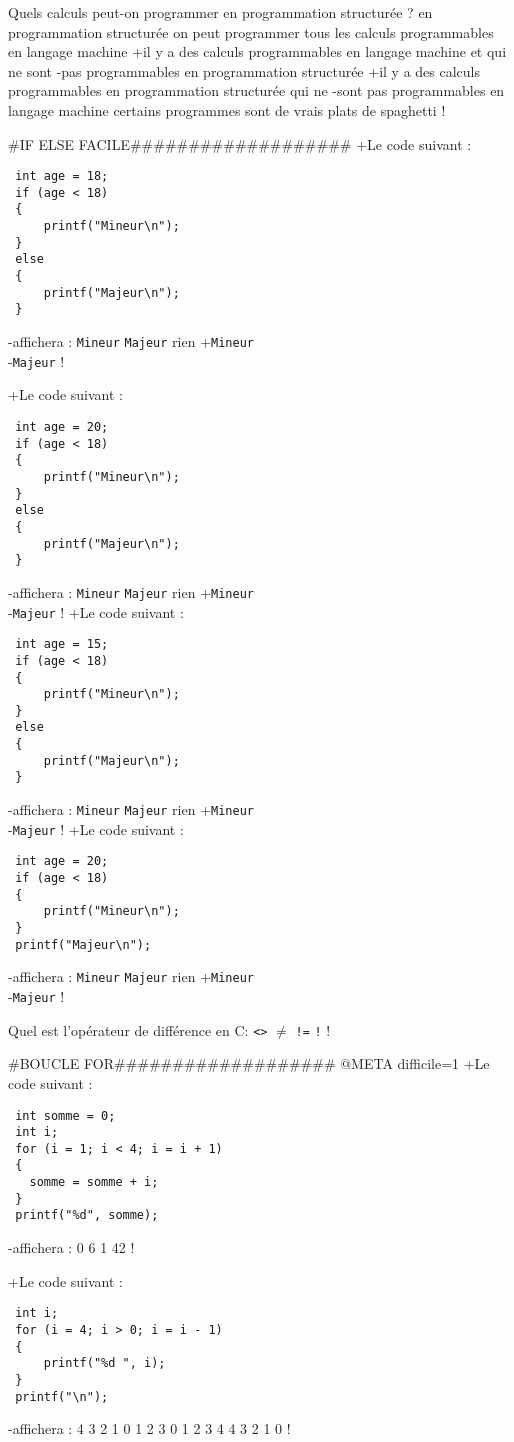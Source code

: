 Quels calculs peut-on programmer en programmation structurée ?
 en programmation structurée on peut programmer tous les calculs programmables en langage machine
+il y a des calculs programmables en langage machine et qui ne sont
-pas programmables en programmation structurée
+il y a des calculs programmables en programmation structurée qui ne
-sont pas programmables en langage machine
 certains programmes sont de vrais plats de spaghetti
!

#IF ELSE FACILE###################
+Le code suivant :
 \begin{verbatim}
 int age = 18;
 if (age < 18)
 {
     printf("Mineur\n"); 
 }
 else
 {
     printf("Majeur\n"); 
 }
 \end{verbatim}
-affichera :
 \verb|Mineur|
 \verb|Majeur|
 rien
+\verb|Mineur|\\
-\verb|Majeur|
!

+Le code suivant :
 \begin{verbatim}
 int age = 20;
 if (age < 18)
 {
     printf("Mineur\n"); 
 }
 else
 {
     printf("Majeur\n"); 
 }
 \end{verbatim}
-affichera :
 \verb|Mineur|
 \verb|Majeur|
 rien
+\verb|Mineur|\\
-\verb|Majeur|
!
+Le code suivant :
 \begin{verbatim}
 int age = 15;
 if (age < 18)
 {
     printf("Mineur\n"); 
 }
 else
 {
     printf("Majeur\n"); 
 }
 \end{verbatim}
-affichera :
 \verb|Mineur|
 \verb|Majeur|
 rien
+\verb|Mineur|\\
-\verb|Majeur|
!
+Le code suivant :
 \begin{verbatim}
 int age = 20;
 if (age < 18)
 {
     printf("Mineur\n"); 
 }
 printf("Majeur\n"); 
\end{verbatim}
-affichera :
 \verb|Mineur|
 \verb|Majeur|
 rien
+\verb|Mineur|\\
-\verb|Majeur|
!


Quel est l'opérateur de différence en C:
 \verb|<>|
 \texttt{$\neq$}
 \verb|!=|
 \verb|!|
!

#BOUCLE FOR###################
@META difficile=1
+Le code suivant :
 \begin{verbatim}
 int somme = 0;
 int i;
 for (i = 1; i < 4; i = i + 1)
 {
   somme = somme + i;
 }
 printf("%d", somme); 
 \end{verbatim}
-affichera :
 0
 6
 1
 42
!

+Le code suivant :
 \begin{verbatim}
 int i;
 for (i = 4; i > 0; i = i - 1)
 {
     printf("%d ", i); 
 }
 printf("\n");
\end{verbatim}
-affichera :
 4 3 2 1
 0 1 2 3
 0 1 2 3 4
 4 3 2 1 0
!

